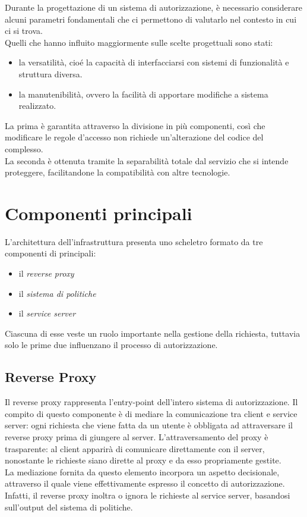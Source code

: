 Durante la progettazione di un sistema di autorizzazione, è necessario considerare alcuni parametri fondamentali che ci permettono di valutarlo 
nel contesto in cui ci si trova.
\\ Quelli che hanno influito maggiormente sulle scelte progettuali sono stati:
\begin{itemize}
    \item la versatilità, cioé la capacità di interfacciarsi con sistemi di 
    funzionalità e struttura diversa.
    \item la manutenibilità, ovvero la facilità di apportare modifiche a sistema realizzato.
\end{itemize}
La prima è garantita attraverso la divisione in più componenti, così che modificare le regole d'accesso non richiede 
un'alterazione del codice del complesso. 
\\ La seconda è ottenuta tramite la separabilità totale dal servizio che si intende proteggere,
 facilitandone la compatibilità con altre tecnologie.   

\section{Componenti principali}

L'architettura dell'infrastruttura presenta uno scheletro formato da tre componenti di principali: 
\begin{itemize}
    \item il \textit{reverse proxy}
    \item il \textit{sistema di politiche}
    \item il \textit{service server}
\end{itemize}
Ciascuna di esse veste un ruolo importante nella gestione della richiesta, tuttavia solo le prime due influenzano il processo di autorizzazione. 

\subsection{Reverse Proxy}
Il reverse proxy rappresenta l'entry-point dell'intero sistema di autorizzazione. Il compito di questo componente è di
mediare la comunicazione tra client e service server: ogni richiesta che viene fatta da un utente è obbligata ad attraversare 
il reverse proxy prima di giungere al server. 
L'attraversamento del proxy è trasparente: al client apparirà di comunicare direttamente con il server, nonostante le richieste siano dirette al proxy e da esso propriamente gestite. 
\\ La mediazione fornita da questo elemento incorpora un aspetto decisionale, attraverso il quale viene effettivamente espresso il concetto di autorizzazione. 
Infatti, il reverse proxy inoltra o ignora le richieste al service server, basandosi sull'output del sistema di politiche.  
 
